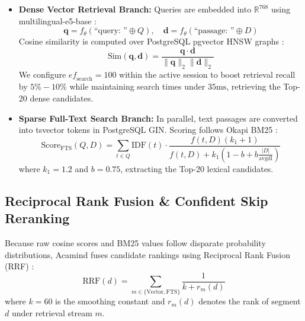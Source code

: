 \documentclass[10pt]{SPIIRAS_Proceedings}
\begin{document}
\begin{itemize}
    \item \textbf{Dense Vector Retrieval Branch:} Queries are embedded into $\mathbb{R}^{768}$ using multilingual-e5-base \cite{wang2022text}:
    \begin{equation}
    \mathbf{q} = f_{\theta}(\text{``query: ''} \oplus Q), \quad \mathbf{d} = f_{\theta}(\text{``passage: ''} \oplus D)
    \end{equation}
    Cosine similarity is computed over PostgreSQL pgvector HNSW graphs \cite{malkov2020efficient}:
    \begin{equation}
    \text{Sim}(\mathbf{q}, \mathbf{d}) = \frac{\mathbf{q} \cdot \mathbf{d}}{\|\mathbf{q}\|_2 \|\mathbf{d}\|_2}
    \end{equation}
    We configure $\mathit{ef}_{\text{search}}=100$ within the active session to boost retrieval recall by $5\%-10\%$ while maintaining search times under $35\text{ms}$, retrieving the Top-20 dense candidates.
    \item \textbf{Sparse Full-Text Search Branch:} In parallel, text passages are converted into tsvector tokens in PostgreSQL GIN. Scoring follows Okapi BM25 \cite{formal2021splade}:
    \begin{equation}
    \text{Score}_{\text{FTS}}(Q,D) = \sum_{t\in Q} \text{IDF}(t) \cdot \frac{f(t,D)(k_1+1)}{f(t,D)+k_1\left(1-b+b\frac{|D|}{\text{avgdl}}\right)}
    \end{equation}
    where $k_1=1.2$ and $b=0.75$, extracting the Top-20 lexical candidates.
\end{itemize}

\subsection{Reciprocal Rank Fusion \& Confident Skip Reranking}
Because raw cosine scores and BM25 values follow disparate probability distributions, Acamind fuses candidate rankings using Reciprocal Rank Fusion (RRF) \cite{cormack2009reciprocal}:
\begin{equation}
\text{RRF}(d) = \sum_{m \in \{\text{Vector}, \text{FTS}\}} \frac{1}{k + r_m(d)}
\end{equation}
where $k=60$ is the smoothing constant and $r_m(d)$ denotes the rank of segment $d$ under retrieval stream $m$.
\end{document}
